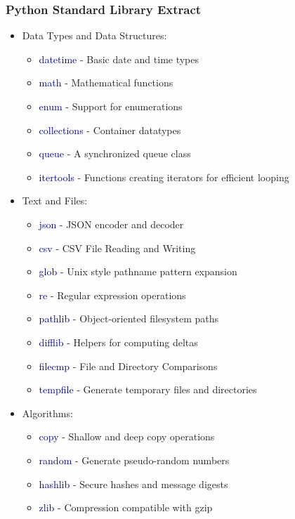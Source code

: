 \begin{frame}[allowframebreaks]\frametitle{Python Standard Library Extract}
   \begin{itemize}
      \item Data Types and Data Structures:
      \begin{itemize}
         \item \textcolor{DarkBlue}{datetime} - Basic date and time types
         \item \textcolor{DarkBlue}{math} - Mathematical functions
         \item \textcolor{DarkBlue}{enum} - Support for enumerations
         \item \textcolor{DarkBlue}{collections} - Container datatypes
         \item \textcolor{DarkBlue}{queue} - A synchronized queue class
         \item \textcolor{DarkBlue}{itertools} - Functions creating iterators for efficient looping
      \end{itemize}
      \vspace{0.3em}

      \item Text and Files:
      \begin{itemize}
         \item \textcolor{DarkBlue}{json} - JSON encoder and decoder
         \item \textcolor{DarkBlue}{csv} - CSV File Reading and Writing
         \item \textcolor{DarkBlue}{glob} - Unix style pathname pattern expansion
         \item \textcolor{DarkBlue}{re} - Regular expression operations
         \item \textcolor{DarkBlue}{pathlib} - Object-oriented filesystem paths
         \item \textcolor{DarkBlue}{difflib} - Helpers for computing deltas
         \item \textcolor{DarkBlue}{filecmp} - File and Directory Comparisons
         \item \textcolor{DarkBlue}{tempfile} - Generate temporary files and directories
      \end{itemize}
      \vspace{0.3em}

      \item Algorithms:
      \begin{itemize}
         \item \textcolor{DarkBlue}{copy} - Shallow and deep copy operations
         \item \textcolor{DarkBlue}{random} - Generate pseudo-random numbers
         \item \textcolor{DarkBlue}{hashlib} - Secure hashes and message digests
         \item \textcolor{DarkBlue}{zlib} - Compression compatible with gzip
      \end{itemize}
      \vspace{0.3em}


\end{itemize}
\end{frame}
